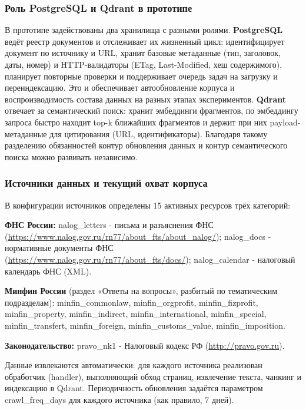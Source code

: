 \documentclass[a4paper,12pt]{article}
\begin{document}
\subsubsection{Роль PostgreSQL и Qdrant в прототипе}

В прототипе задействованы два хранилища с разными ролями. \textbf{PostgreSQL} ведёт реестр документов и отслеживает их жизненный цикл: идентифицирует документ по источнику и URL, хранит базовые метаданные (тип, заголовок, даты, номер) и HTTP-валидаторы (ETag, Last-Modified, хеш содержимого), планирует повторные проверки и поддерживает очередь задач на загрузку и переиндексацию. Это и обеспечивает автообновление корпуса и воспроизводимость состава данных на разных этапах экспериментов. \textbf{Qdrant} отвечает за семантический поиск: хранит эмбеддинги фрагментов, по эмбеддингу запроса быстро находит top-k ближайших фрагментов и держит при них payload-метаданные для цитирования (URL, идентификаторы). Благодаря такому разделению обязанностей контур обновления данных и контур семантического поиска можно развивать независимо.

\subsubsection{Источники данных и текущий охват корпуса}

В конфигурации источников определены 15 активных ресурсов трёх категорий:

\textbf{ФНС России:} nalog\_letters - письма и разъяснения ФНС (\url{https://www.nalog.gov.ru/rn77/about_fts/about_nalog/}); nalog\_docs - нормативные документы ФНС (\url{https://www.nalog.gov.ru/rn77/about_fts/docs/}); nalog\_calendar - налоговый календарь ФНС (XML).

\textbf{Минфин России} (раздел «Ответы на вопросы», разбитый по тематическим подразделам):
minfin\_commonlaw, minfin\_orgprofit, minfin\_fizprofit, minfin\_property, minfin\_indirect, minfin\_international, minfin\_special, minfin\_transfert, minfin\_foreign, minfin\_customs\_value, minfin\_imposition.

\textbf{Законодательство:} pravo\_nk1 - Налоговый кодекс РФ (\url{http://pravo.gov.ru}).

Данные извлекаются автоматически: для каждого источника реализован обработчик (handler), выполняющий обход страниц, извлечение текста, чанкинг и индексацию в Qdrant. Периодичность обновления задаётся параметром crawl\_freq\_days для каждого источника (как правило, 7 дней).
\end{document}
